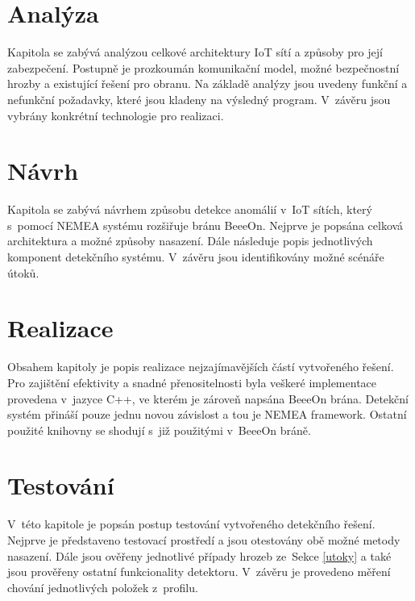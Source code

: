 \documentclass[thesis=M,czech]{FITthesis}[2012/06/26]
\begin{document}
\chapter{Analýza}
Kapitola se zabývá analýzou celkové architektury IoT sítí a způsoby pro její
zabezpečení. Postupně je prozkoumán komunikační model, možné bezpečnostní hrozby 
a existující řešení pro obranu. Na základě analýzy jsou uvedeny funkční a nefunkční
požadavky, které jsou kladeny na výsledný program. V~závěru jsou vybrány konkrétní
technologie pro realizaci.

 


\chapter{Návrh}
Kapitola se zabývá návrhem způsobu detekce anomálií v~IoT sítích, který s~pomocí NEMEA
systému rozšiřuje bránu BeeeOn. Nejprve je popsána celková architektura a
možné způsoby nasazení. Dále následuje popis jednotlivých komponent detekčního systému.
V~závěru jsou identifikovány možné scénáře útoků.

 

\chapter{Realizace}
Obsahem kapitoly je popis realizace nejzajímavějších částí vytvořeného řešení. Pro zajištění
efektivity a snadné přenositelnosti byla veškeré implementace provedena v~jazyce C++, ve kterém
je zároveň napsána BeeeOn brána. Detekční systém přináší pouze jednu novou závislost a tou je NEMEA framework.
Ostatní použité knihovny se shodují s~již použitými v~BeeeOn bráně.

 

\chapter{Testování}
V~této kapitole je popsán postup testování vytvořeného detekčního řešení. Nejprve je představeno
testovací prostředí a jsou otestovány obě možné metody nasazení. Dále jsou ověřeny jednotlivé 
případy hrozeb ze~Sekce \ref{utoky} a také jsou prověřeny ostatní funkcionality
detektoru. V~závěru je provedeno měření chování jednotlivých položek z~profilu.

 
\end{document}

